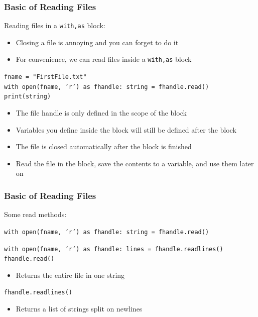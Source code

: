 \documentclass{beamer}
\newcommand{\code}[1]{\texttt{#1}}
\newcommand{\tab}{\hspace*{22pt}}
\begin{document}
\begin{frame}	
	\frametitle{Basic of Reading Files}
	
	\begin{block}{Reading files in a \code{with,as} block:}
			\begin{itemize}
				\item Closing a file is annoying and you can forget to do it
				\item For convenience, we can read files inside a \code{with,as} block
			\end{itemize}
			
			\vspace{20pt}
			\code{fname = "FirstFile.txt" \\
					with open(fname, 'r') as fhandle:
					\tab string = fhandle.read() \\
					\tab print(string)
			}
		\endminipage\hfill
			\begin{itemize}
				\item The file handle is only defined in the scope of the block
				\item Variables you define inside the block will still be defined after the block
				\item The file is closed automatically after the block is finished
				\item Read the file in the block, save the contents to a variable, and use them later on
			\end{itemize}
		\endminipage\hfill
	\end{block}
	
\end{frame}

\begin{frame}	
	\frametitle{Basic of Reading Files}
	
	\begin{block}{Some read methods:}
			\vspace{10pt}
			
			\code{with open(fname, 'r') as fhandle:
					\tab string = fhandle.read() \\
			}
			
			\vspace{10pt}
			\code{with open(fname, 'r') as fhandle:
					\tab lines = fhandle.readlines() \\
			}
		\endminipage\hfill
		\endminipage\hfill
			\code{fhandle.read()}
			\begin{itemize}
				\item Returns the entire file in one string
			\end{itemize}
			
			\vspace{10pt}
			\code{fhandle.readlines()}
			\begin{itemize}
				\item Returns a list of strings split on newlines
			\end{itemize}
		\endminipage\hfill
	\end{block}
	
\end{frame}
\end{document}
